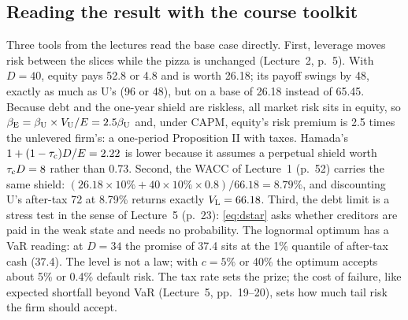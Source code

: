 \subsection{Reading the result with the course toolkit}\label{sec:toolkit}

Three tools from the lectures read the base case directly. First, leverage moves risk between the slices while the pizza is unchanged (Lecture~2, p.~5). With $D = 40$, equity pays 52.8 or 4.8 and is worth 26.18; its payoff swings by 48, exactly as much as U's (96 or 48), but on a base of 26.18 instead of 65.45. Because debt and the one-year shield are riskless, all market risk sits in equity, so $\beta_{\mathrm{E}} = \beta_{\mathrm{U}} \times V_{\mathrm{U}}/E = 2.5\beta_{\mathrm{U}}$ and, under CAPM, equity's risk premium is 2.5 times the unlevered firm's: a one-period Proposition II with taxes. Hamada's $1 + (1 - \tau_{\mathrm{c}})D/E = 2.22$ is lower because it assumes a perpetual shield worth $\tau_{\mathrm{c}} D = 8$ rather than 0.73. Second, the WACC of Lecture~1 (p.~52) carries the same shield: $(26.18 \times 10\% + 40 \times 10\% \times 0.8)/66.18 = 8.79\%$, and discounting U's after-tax 72 at 8.79\% returns exactly $V_{\mathrm{L}} = 66.18$. Third, the debt limit is a stress test in the sense of Lecture~5 (p.~23): \eqref{eq:dstar} asks whether creditors are paid in the weak state and needs no probability. The lognormal optimum has a VaR reading: at $D = 34$ the promise of 37.4 sits at the 1\% quantile of after-tax cash (37.4). The level is not a law; with $c = 5\%$ or 40\% the optimum accepts about 5\% or 0.4\% default risk. The tax rate sets the prize; the cost of failure, like expected shortfall beyond VaR (Lecture~5, pp.~19--20), sets how much tail risk the firm should accept.
